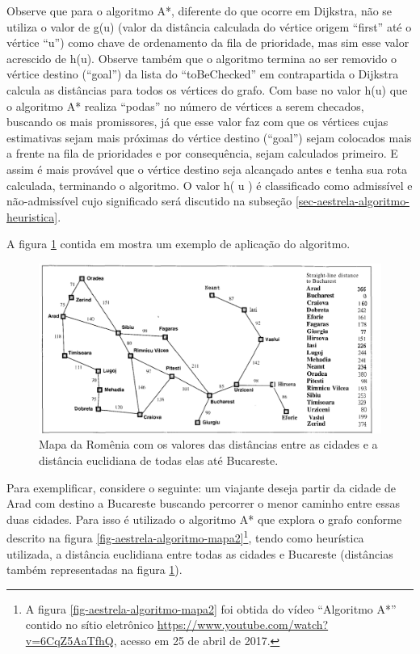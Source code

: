 Observe que para o algoritmo A*, diferente do que ocorre em Dijkstra, não se utiliza o valor de g(u) (valor da distância calculada do vértice origem ``first'' até o vértice ``u'') como chave de ordenamento da fila de prioridade, mas sim esse valor acrescido de h(u). Observe também que o algoritmo termina ao ser removido o vértice destino (``goal'') da lista do ``toBeChecked'' em contrapartida o Dijkstra calcula as distâncias para todos os vértices do grafo. Com base no valor h(u) que o algoritmo A* realiza ``podas'' no número de vértices a serem checados, buscando os mais promissores, já que esse valor faz com que os vértices cujas estimativas sejam mais próximas do vértice destino (``goal'') sejam colocados mais a frente na fila de prioridades e por consequência, sejam calculados primeiro. E assim é mais provável que o vértice destino seja alcançado antes e tenha sua rota calculada, terminando o algoritmo. O valor h( u ) é classificado como admissível e não-admissível cujo significado será discutido na subseção \ref{sec-aestrela-algoritmo-heuristica}.

A figura \ref{fig-aestrela-algoritmo-mapa1} contida em  mostra um exemplo de aplicação do algoritmo.

\begin{figure}[H]
\centering
\includegraphics[width=.90\textwidth]{figuras/Aestrela-mapa1} 
\caption{Mapa da Romênia com os valores das distâncias entre as cidades e a distância euclidiana de todas elas até Bucareste.}
\label{fig-aestrela-algoritmo-mapa1}
\end{figure}
\newpage
Para exemplificar, considere o seguinte: um viajante deseja partir da cidade de Arad com destino a Bucareste buscando percorrer o menor caminho entre essas duas cidades. Para isso é utilizado o algoritmo A* que explora o grafo conforme descrito na figura \ref{fig-aestrela-algoritmo-mapa2}\footnote{A figura \ref{fig-aestrela-algoritmo-mapa2} foi obtida do vídeo ``Algoritmo A*'' contido no sítio eletrônico \url{https://www.youtube.com/watch?v=6CqZ5AaTfhQ}, acesso em 25 de abril de 2017.}, tendo como heurística utilizada, a distância euclidiana entre todas as cidades e Bucareste (distâncias também representadas na figura \ref{fig-aestrela-algoritmo-mapa1}).

